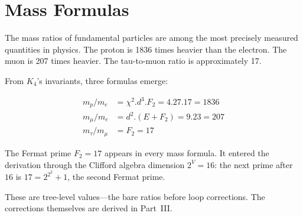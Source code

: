 \documentclass[11pt,a4paper]{book}
\def\cdot{.}%
\newcommand{\VoidRef}[2]{\textit{#2} (in \textit{Void})}
\begin{document}
\section{Mass Formulas}

The mass ratios of fundamental particles are among the most precisely measured quantities in physics. The proton is 1836 times heavier than the electron. The muon is 207 times heavier. The tau-to-muon ratio is approximately 17.

From $K_4$'s invariants, three formulas emerge:

\begin{align}
m_p / m_e &= \chi^2 \cdot d^3 \cdot F_2 = 4 \cdot 27 \cdot 17 = 1836 \\
m_\mu / m_e &= d^2 \cdot (E + F_2) = 9 \cdot 23 = 207 \\
m_\tau / m_\mu &= F_2 = 17
\end{align}

The Fermat prime $F_2 = 17$ appears in every mass formula. It entered the derivation through the Clifford algebra dimension $2^V = 16$: the next prime after $16$ is $17 = 2^{2^2} + 1$, the second Fermat prime.%

These are tree-level values---the bare ratios before loop corrections. The corrections themselves are derived in Part~III.

\begin{code}%
\>[0]\<%
\\
\>[0]\AgdaSpace{}%
\AgdaSymbol{:}\AgdaSpace{}%
\<%
\\
\>[0]\AgdaSpace{}%
\AgdaSymbol{=}\AgdaSpace{}%
%
\>[35]\<%
\\
%
\\[\AgdaEmptyExtraSkip]%
\>[0]\<%
\\
\>[0]\AgdaSpace{}%
\AgdaSymbol{:}\AgdaSpace{}%
\<%
\\
\>[0]\AgdaSpace{}%
\AgdaSymbol{=}\AgdaSpace{}%
%
\>[42]\<%
\\
%
\\[\AgdaEmptyExtraSkip]%
\>[0]\<%
\\
\>[0]\AgdaSpace{}%
\AgdaSymbol{:}\AgdaSpace{}%
\<%
\\
\>[0]\AgdaSpace{}%
\AgdaSymbol{=}\AgdaSpace{}%
%
\>[34]\<%
\end{code}
\end{document}
